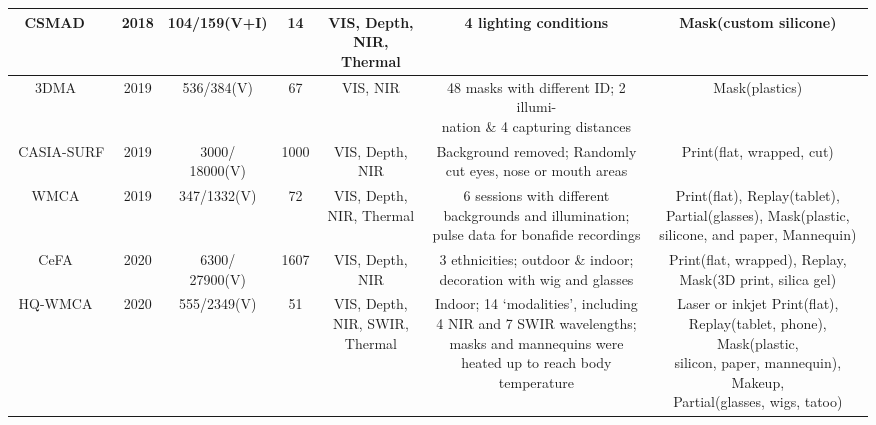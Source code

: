 \documentclass[10pt,journal,compsoc]{IEEEtran}
\begin{document}
\begin{table}
{\begin{tabular}{c c c c c c c}
 \midrule
CSMAD
~\cite{bhattacharjee2018spoofing} & 2018 &  104/159(V+I)  & 14 & \tabincell{c}{VIS, Depth, \\NIR, Thermal} &  4 lighting conditions  & Mask(custom silicone)\\

 \midrule
3DMA
~\cite{xiao20193dma} & 2019 & 536/384(V) & 67 & VIS, NIR &  \tabincell{c}{48 masks with different ID; 2 illumi-\\ nation \& 4 capturing distances}  & Mask(plastics)\\


 \midrule
CASIA-SURF
~\cite{casiasurf} & 2019 &  \tabincell{c}{3000/\\18000(V)} & 1000 &  \tabincell{c}{VIS, Depth,\\ NIR} &  \tabincell{c}{Background removed; Randomly \\cut  eyes, nose or mouth areas}  & Print(flat, wrapped, cut)\\


 \midrule
WMCA
~\cite{george2019biometric} & 2019 & 347/1332(V) & 72 &  \tabincell{c}{VIS, Depth,\\ NIR, Thermal}  &  \tabincell{c}{6 sessions with different \\backgrounds and illumination; \\pulse data for bonafide recordings}  & \tabincell{c}{Print(flat), Replay(tablet),\\ Partial(glasses), Mask(plastic, \\silicone, and paper, Mannequin)}\\


 \midrule
CeFA
~\cite{li2020casia} & 2020 &   \tabincell{c}{6300/\\27900(V)} & 1607 & \tabincell{c}{VIS, Depth,\\NIR} &   \tabincell{c}{3 ethnicities; outdoor \& indoor;\\ decoration with wig and glasses} & \tabincell{c}{Print(flat, wrapped), Replay, \\Mask(3D print, silica gel)}\\


 \midrule
HQ-WMCA
~\cite{heusch2020deep} & 2020 &  555/2349(V) & 51 & \tabincell{c}{VIS, Depth, \\NIR, SWIR,\\Thermal} &   \tabincell{c}{Indoor; 14 `modalities', including \\4
NIR and 7 SWIR wavelengths; \\masks and mannequins were \\heated up to reach body temperature} & \tabincell{c}{Laser or inkjet  Print(flat), \\Replay(tablet, phone), Mask(plastic, \\silicon, paper, mannequin), Makeup,\\ Partial(glasses, wigs, tatoo)}\\


\end{tabular}}
\end{table}
\end{document}
